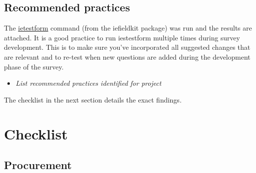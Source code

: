 \documentclass{report}
\begin{document}
	\subsection*{Recommended practices}
	
	The \href{https://dimewiki.worldbank.org/Ietestform}{ietestform} command (from the iefieldkit package) was run and the results are attached. It is a good practice to run iestestform multiple times during survey development. This is to make sure you’ve incorporated all suggested changes that are relevant and to re-test when new questions are added during the development phase of the survey.
	\begin{itemize}
		\item \textit{List recommended practices identified for project}
	\end{itemize}
	
	The checklist in the next section details the exact findings.
	\newpage 
	
	\section*{Checklist}


		
		\subsection*{Procurement}


\newcommand{\makerow}[1]{%
 #1 &
 \stepcounter{row}%
 \mbox{\CheckBox[print,name=Included\therow, width=0.7em, height=0.7em]{}} &
 \mbox{\CheckBox[print,name=Sufficient Time\therow, width=0.7em, height=0.7em]{}} &
 \mbox{\CheckBox[print,name=N/A\therow, width=0.7em, height=0.7em]{}} \\
}
\end{document}
